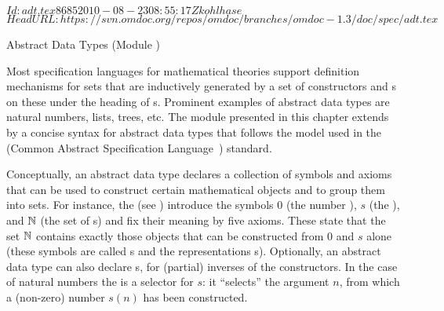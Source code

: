 \svnInfo $Id: adt.tex 8685 2010-08-23 08:55:17Z kohlhase $
\svnKeyword $HeadURL: https://svn.omdoc.org/repos/omdoc/branches/omdoc-1.3/doc/spec/adt.tex $

\begin{tchapter}[id=adt,short=Abstract Data Types]{Abstract Data Types (Module {})}

  Most specification languages for mathematical theories support definition mechanisms for
  sets that are inductively generated by a set of constructors and
  {s} on these under the heading of {s}. Prominent examples of abstract data types are natural numbers, lists,
  trees, etc. The module {} presented in this chapter extends {\omdoc} by
  a concise syntax for abstract data types that follows the model used in the {\casl}
  (Common Abstract Specification Language~\cite{CoFI:2004:CASL-RM}) standard.

  Conceptually, an abstract data type declares a collection of symbols and axioms that can
  be used to construct certain mathematical objects and to group them into sets. For
  instance, the {} (see {}) introduce the symbols
  $0$ (the number {}), $s$ (the {}), and ${\mathbb{N}}$
  (the set of {s}) and fix their meaning by five axioms. These
  state that the set ${\mathbb{N}}$ contains exactly those objects that can be constructed from $0$
  and $s$ alone (these symbols are called {s} and the
  representations {s}). Optionally, an abstract data type can
  also declare {s}, for (partial) inverses of the
  constructors. In the case of natural numbers the {} is a
  selector for $s$: it ``selects'' the argument $n$, from which a (non-zero) number $s(n)$
  has been constructed.


\end{tchapter}
